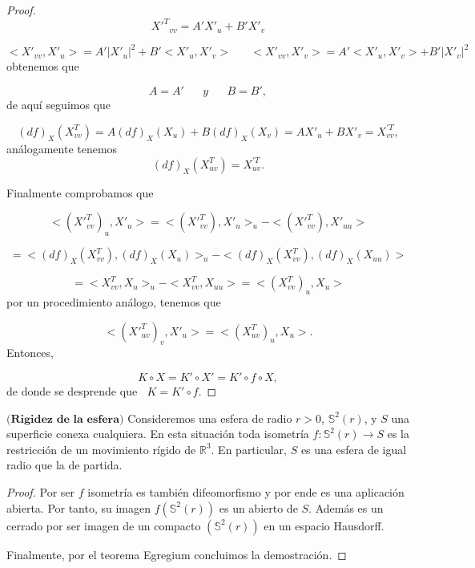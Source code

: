 \begin{proof}
	\[
		{X'^T}_{vv} = A'X'_u + B'X'_v
	\]
	
	\[
		<X'_{vv}, X'_u> = A'|X'_u|^2 + B'<X'_u, X'_v> \;\;\;\;\;\; <X'_{vv}, X'_v> = A'<X'_u, X'_v> + B'|X'_v|^2
	\]
	obtenemos que
	
	\[
		A = A' \;\;\;\;\;\; y \;\;\;\;\;\; B = B',
	\]
	de aquí seguimos que
	
	\[
		(df)_X(X^{T}_{vv}) = A(df)_X(X_u) + B(df)_X(X_v) = AX'_u + BX'_v = X^{'T}_{vv},
	\]
	análogamente tenemos
	\[
		(df)_X(X^{T}_{uv}) = X^{'T}_{uv}.
	\]
	
	Finalmente comprobamos que
	
	\[
		<(X'^{T}_{vv})_u, X'_u> = <(X'^{T}_{vv}), X'_u>_u - <(X'^{T}_{vv}), X'_{uu}>
	\]
	
	\[
		= <(df)_X(X^{T}_{vv}), (df)_X(X_u)>_u - <(df)_X(X^{T}_{vv}), (df)_X(X_{uu})>
	\]
	
	\[
		= <X^{T}_{vv}, X_u>_u - <X^{T}_{vv}, X_{uu}> = <(X^{T}_{vv})_u, X_u>
	\]
	por un procedimiento análogo, tenemos que
	
	\[
		<(X'^{T}_{uv})_v, X'_u> = <(X^{T}_{uv})_u, X_u>.
	\]
	${ }$\\	
	
	Entonces,
	
	\[
		K \circ X = K' \circ X' = K' \circ f \circ X,
	\]
	de donde se desprende que   $\;\; K = K' \circ f$.
	
\end{proof}

\begin{teorema}
	$\textbf{(Rigidez de la esfera)}$ Consideremos una esfera de radio $r>0$, $\mathbb{S}^2(r)$, y $S$ una superficie conexa cualquiera. En esta situación toda isometría $f : \mathbb{S}^2(r) \to S$ es la restricción de un movimiento rígido de $\mathbb{R}^3$. En particular, $S$ es una esfera de igual radio que la de partida.
\end{teorema}

\begin{proof}
	Por ser $f$ isometría es también difeomorfismo y por ende es una aplicación abierta. Por tanto, su imagen $f(\mathbb{S}^2(r))$ es un abierto de $S$. Además es un cerrado por ser imagen de un compacto $(\mathbb{S}^2(r))$ en un espacio Hausdorff.
	
	Finalmente, por el teorema Egregium concluimos la demostración.
\end{proof}
	${ }$\\

